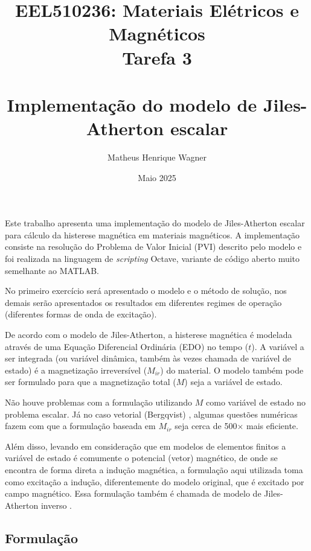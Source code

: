 \documentclass{homeworg}
\title{EEL510236: Materiais Elétricos e Magnéticos\\Tarefa 3\\\phantom{a}\\\Large Implementação do modelo de Jiles-Atherton escalar}
\author{Matheus Henrique Wagner}
\date{Maio 2025}
\begin{document}
\maketitle

\hspace{1cm} Este trabalho apresenta uma implementação do modelo de Jiles-Atherton escalar \cite{ja} para cálculo da histerese magnética em materiais magnéticos. A implementação consiste na resolução do Problema de Valor Inicial (PVI) descrito pelo modelo e foi realizada na linguagem de \textit{scripting} Octave, variante de código aberto muito semelhante ao MATLAB.

\hspace{1cm} No primeiro exercício será apresentado o modelo e o método de solução, nos demais serão apresentados os resultados em diferentes regimes de operação (diferentes formas de onda de excitação).

\exercise

\hspace{1cm} De acordo com o modelo de Jiles-Atherton, a histerese magnética é modelada através de uma Equação Diferencial Ordinária (EDO) no tempo ($t$). A variável a ser integrada (ou variável dinâmica, também às vezes chamada de variável de estado) é a magnetização irreversível ($M_{ir}$) do material. O modelo também pode ser formulado para que a magnetização total ($M$) seja a variável de estado.

\hspace{1cm} Não houve problemas com a formulação utilizando $M$ como variável de estado no problema escalar. Já no caso vetorial (Bergqvist) \cite{dular}, algumas questões numéricas fazem com que a formulação baseada em $M_{ir}$ seja cerca de 500$\times$ mais eficiente.

\hspace{1cm} Além disso, levando em consideração que em modelos de elementos finitos a variável de estado é comumente o potencial (vetor) magnético, de onde se encontra de forma direta a indução magnética, a formulação aqui utilizada toma como excitação a indução, diferentemente do modelo original, que é excitado por campo magnético. Essa formulação também é chamada de modelo de Jiles-Atherton inverso \cite{joe}.

\newpage

\subsection{Formulação}
\end{document}
